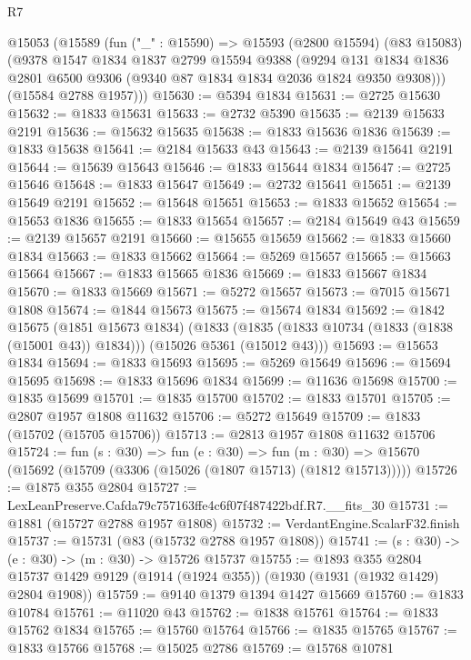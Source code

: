 \begin{lexlean}{R7}
\begin{coremodule}
  @15053
    (@15589
      (fun ("_" : @15590) =>
      @15593
        (@2800 @15594)
        (@83 @15083)
        (@9378
          @1547
          @1834
          @1837
          @2799
          @15594
          @9388
          (@9294
            @131
            @1834
            @1836
            @2801
            @6500
            @9306
            (@9340 @87 @1834 @1834 @2036 @1824 @9350 @9308)))
        (@15584 @2788 @1957)))
@15630 := @5394 @1834
@15631 := @2725 @15630
@15632 := @1833 @15631
@15633 := @2732 @5390
@15635 := @2139 @15633 @2191
@15636 := @15632 @15635
@15638 := @1833 @15636 @1836
@15639 := @1833 @15638
@15641 := @2184 @15633 @43
@15643 := @2139 @15641 @2191
@15644 := @15639 @15643
@15646 := @1833 @15644 @1834
@15647 := @2725 @15646
@15648 := @1833 @15647
@15649 := @2732 @15641
@15651 := @2139 @15649 @2191
@15652 := @15648 @15651
@15653 := @1833 @15652
@15654 := @15653 @1836
@15655 := @1833 @15654
@15657 := @2184 @15649 @43
@15659 := @2139 @15657 @2191
@15660 := @15655 @15659
@15662 := @1833 @15660 @1834
@15663 := @1833 @15662
@15664 := @5269 @15657
@15665 := @15663 @15664
@15667 := @1833 @15665 @1836
@15669 := @1833 @15667 @1834
@15670 := @1833 @15669
@15671 := @5272 @15657
@15673 := @7015 @15671 @1808
@15674 := @1844 @15673
@15675 := @15674 @1834
@15692 := @1842
    @15675
    (@1851 @15673 @1834)
    (@1833 (@1835 (@1833 @10734 (@1833 (@1838 (@15001 @43)) @1834))) (@15026 @5361 (@15012 @43)))
@15693 := @15653 @1834
@15694 := @1833 @15693
@15695 := @5269 @15649
@15696 := @15694 @15695
@15698 := @1833 @15696 @1834
@15699 := @11636 @15698
@15700 := @1835 @15699
@15701 := @1835 @15700
@15702 := @1833 @15701
@15705 := @2807 @1957 @1808 @11632
@15706 := @5272 @15649
@15709 := @1833 (@15702 (@15705 @15706))
@15713 := @2813 @1957 @1808 @11632 @15706
@15724 := fun (s : @30) =>
  fun (e : @30) =>
  fun (m : @30) => @15670 (@15692 (@15709 (@3306 (@15026 (@1807 @15713) (@1812 @15713)))))
@15726 := @1875 @355 @2804
@15727 := LexLeanPreserve.Cafda79c757163ffe4c6f07f487422bdf.R7.__fits_30
@15731 := @1881 (@15727 @2788 @1957 @1808)
@15732 := VerdantEngine.ScalarF32.finish
@15737 := @15731 (@83 (@15732 @2788 @1957 @1808))
@15741 := (s : @30) -> (e : @30) -> (m : @30) -> @15726 @15737
@15755 := @1893
    @355
    @2804
    @15737
    @1429
    @9129
    (@1914 (@1924 @355))
    (@1930 (@1931 (@1932 @1429) @2804 @1908))
@15759 := @9140 @1379 @1394 @1427 @15669
@15760 := @1833 @10784
@15761 := @11020 @43
@15762 := @1838 @15761
@15764 := @1833 @15762 @1834
@15765 := @15760 @15764
@15766 := @1835 @15765
@15767 := @1833 @15766
@15768 := @15025 @2786
@15769 := @15768 @10781

\end{coremodule}
\end{lexlean}

